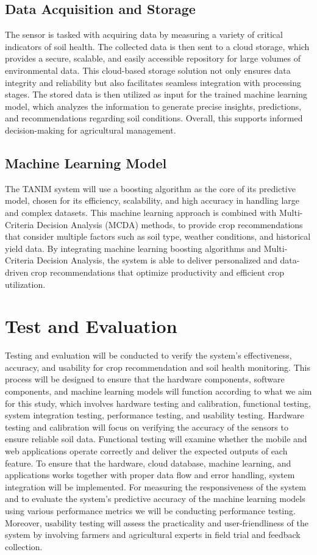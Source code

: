 {	\subsection{Data Acquisition and Storage}
	The sensor is tasked with acquiring data by measuring a variety of critical indicators of soil health. The collected data is then sent to a cloud storage, which provides a secure, scalable, and easily accessible repository for large volumes of environmental data. This cloud-based storage solution not only ensures data integrity and reliability but also facilitates seamless integration with processing stages. The stored data is then utilized as input for the trained machine learning model, which analyzes the information to generate precise insights, predictions, and recommendations regarding soil conditions. Overall, this supports informed decision-making for agricultural management.
	
	\subsection{Machine Learning Model}
	The TANIM system will use a boosting algorithm as the core of its predictive model, chosen for its efficiency, scalability, and high accuracy in handling large and complex datasets. This machine learning approach is combined with Multi-Criteria Decision Analysis (MCDA) methods, to provide crop recommendations that consider multiple factors such as soil type, weather conditions, and historical yield data. By integrating machine learning boosting algorithms and Multi-Criteria Decision Analysis, the system is able to deliver personalized and data-driven crop recommendations that optimize productivity and efficient crop utilization.
	
	\section{Test and Evaluation}
	Testing and evaluation will be conducted to verify the system’s effectiveness, accuracy, and usability for crop recommendation and soil health monitoring. This process will be designed to ensure that the hardware components, software components, and machine learning models will function according to what we aim for this study, which involves hardware testing and calibration, functional testing, system integration testing, performance testing, and usability testing. Hardware testing and calibration will focus on verifying the accuracy of the sensors to ensure reliable soil data. Functional testing will examine whether the mobile and web applications operate correctly and deliver the expected outputs of each feature. To ensure that the hardware, cloud database, machine learning, and applications works together with proper data flow and error handling, system integration will be implemented. For measuring the responsiveness of the system and to evaluate the system’s predictive accuracy of the machine learning models using various performance metrics we will be conducting performance testing. Moreover, usability testing will assess the practicality and user-friendliness of the system by involving farmers and agricultural experts in field trial and feedback collection.
	
}
